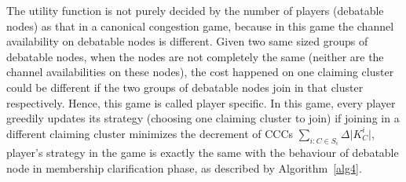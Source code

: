 \documentclass[10pt,journal,compsoc]{IEEEtran}
\theoremstyle{mytheoremstyle}
\theoremstyle{mytheoremstyle}
\theoremstyle{mytheoremstyle}
\begin{document}
\begin{itemize}
The utility function is not purely decided by the number of players (debatable nodes) as that in a canonical congestion game, because in this game the channel availability on debatable nodes is different.
Given two same sized groups of debatable nodes, when the nodes are not completely the same (neither are the channel availabilities on these nodes), the cost happened on one claiming cluster could be different if the two groups of debatable nodes join in that cluster respectively.
Hence, this game is called player specific.
In this game, every player greedily updates its strategy (choosing one claiming cluster to join) if joining in a different claiming cluster minimizes the decrement of CCCs $\sum_{i:C\in S_i} \Delta\vert K^i_C \vert$, player's strategy in the game is exactly the same with the behaviour of debatable node in membership clarification phase, as described by Algorithm~\ref{alg4}.




\end{itemize}

\end{document}
